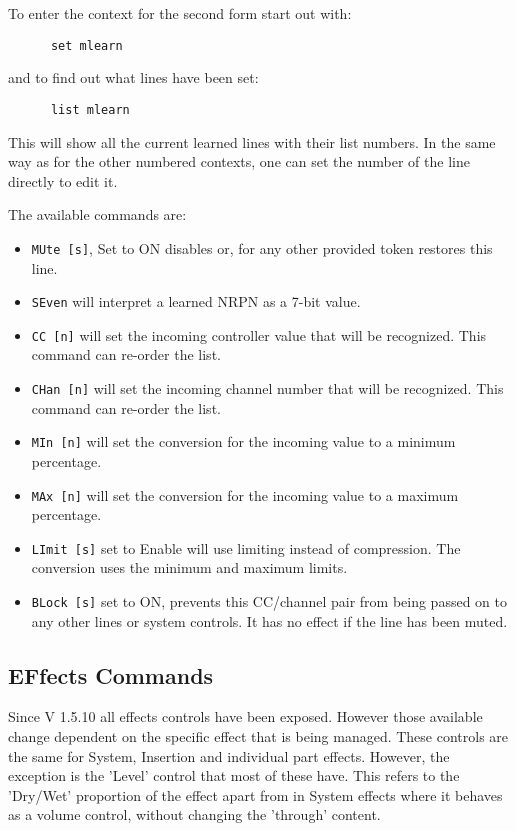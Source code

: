    To enter the context for the second form start out with:
   \begin{verbatim}
      set mlearn
   \end{verbatim}
   and to find out what lines have been set:
   \begin{verbatim}
      list mlearn
   \end{verbatim}
   This will show all the current learned lines with their list numbers.
   In the same way as for the other numbered contexts, one can set the number
   of the line directly to edit it.

   The available commands are:

   \begin{itemize}
      \item \texttt{MUte [s]}, Set to ON disables or, for any other provided token
         restores this line.
      \item \texttt{SEven} will interpret a learned NRPN as a 7-bit value.
      \item \texttt{CC [n]} will set the incoming controller value that will
         be recognized.  This command can re-order the list.
      \item \texttt{CHan [n]} will set the incoming channel number that will
         be recognized.  This command can re-order the list.
      \item \texttt{MIn [n]} will set the conversion for the incoming
         value to a minimum percentage.
      \item \texttt{MAx [n]} will set the conversion for the incoming
         value to a maximum percentage.
      \item \texttt{LImit [s]} set to Enable will use limiting instead of
         compression.  The conversion uses the minimum and maximum limits.
      \item \texttt{BLock [s]} set to ON, prevents this CC/channel pair from
        being passed on to any other lines or system controls.  It has no effect
        if the line has been muted.
   \end{itemize}

\subsection{EFfects Commands}
\label{subsec:command_line_effects}
   Since V 1.5.10 all effects controls have been exposed. However those
   available change dependent on the specific effect that is being managed.
   These controls are the same for System, Insertion and individual part
   effects. However, the exception is the 'Level' control that most of these
   have. This refers to the 'Dry/Wet' proportion of the effect apart from in
   System effects where it behaves as a volume control, without changing the
   'through' content.

